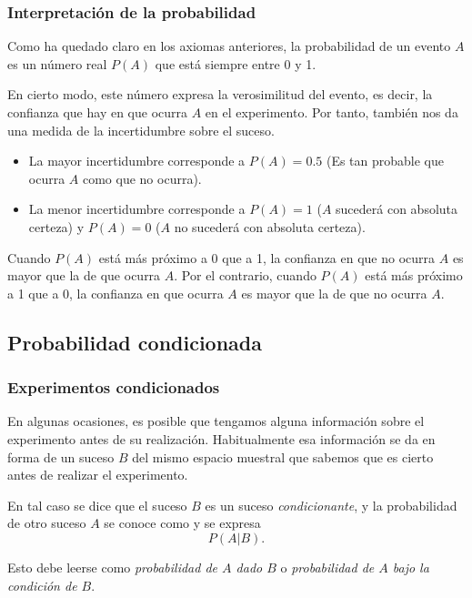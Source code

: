 \begin{frame}
\frametitle{Interpretación de la probabilidad}
Como ha quedado claro en los axiomas anteriores, la probabilidad de un evento $A$ es un número real $P(A)$ que está siempre entre 0 y 1. 

En cierto modo, este número expresa la verosimilitud del evento, es decir, la confianza que hay en que ocurra $A$ en el experimento.
Por tanto, también nos da una medida de la incertidumbre sobre el suceso.
\begin{itemize}
	\item La mayor incertidumbre corresponde a $P(A)=0.5$ (Es tan probable que ocurra $A$ como que no ocurra).
	\item La menor incertidumbre corresponde a $P(A)=1$ ($A$ sucederá con absoluta certeza) y $P(A)=0$ ($A$ no sucederá con absoluta certeza).
\end{itemize} 

Cuando $P(A)$ está más próximo a 0 que a 1, la confianza en que no ocurra $A$ es mayor que la de que ocurra $A$.
Por el contrario, cuando $P(A)$ está más próximo a 1 que a 0, la confianza en que ocurra $A$ es mayor que la de que no ocurra $A$.
\end{frame}


\subsection{Probabilidad condicionada}

\begin{frame}
\frametitle{Experimentos condicionados}
En algunas ocasiones, es posible que tengamos alguna información sobre el experimento antes de su realización. 
Habitualmente esa información se da en forma de un suceso $B$ del mismo espacio muestral que sabemos que es cierto antes de realizar el experimento.

En tal caso se dice que el suceso $B$ es un suceso \emph{condicionante}, y la probabilidad de otro suceso $A$ se conoce como  y se expresa
\[
	P(A|B).
\]

Esto debe leerse como \emph{probabilidad de $A$ dado $B$} o \emph{probabilidad de $A$ bajo la condición de $B$}.
\end{frame}


